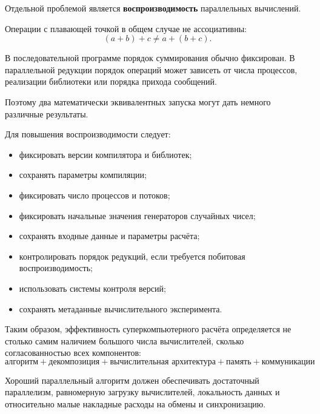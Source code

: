 Отдельной проблемой является \textbf{воспроизводимость} параллельных вычислений.

Операции с плавающей точкой в общем случае не ассоциативны:
\[
(a+b)+c \neq a+(b+c).
\]

В последовательной программе порядок суммирования обычно фиксирован.
В параллельной редукции порядок операций может зависеть от числа процессов,
реализации библиотеки или порядка прихода сообщений.

Поэтому два математически эквивалентных запуска могут дать немного различные
результаты.

Для повышения воспроизводимости следует:
\begin{itemize}
	\item фиксировать версии компилятора и библиотек;
	\item сохранять параметры компиляции;
	\item фиксировать число процессов и потоков;
	\item фиксировать начальные значения генераторов случайных чисел;
	\item сохранять входные данные и параметры расчёта;
	\item контролировать порядок редукций, если требуется побитовая
	воспроизводимость;
	\item использовать системы контроля версий;
	\item сохранять метаданные вычислительного эксперимента.
\end{itemize}

Таким образом, эффективность суперкомпьютерного расчёта определяется не столько
самим наличием большого числа вычислителей, сколько согласованностью всех
компонентов:
\[
\boxed{
	\text{алгоритм}
	+
	\text{декомпозиция}
	+
	\text{вычислительная архитектура}
	+
	\text{память}
	+
	\text{коммуникации}
}
\]

Хороший параллельный алгоритм должен обеспечивать достаточный параллелизм,
равномерную загрузку вычислителей, локальность данных и относительно малые
накладные расходы на обмены и синхронизацию.

\newpage